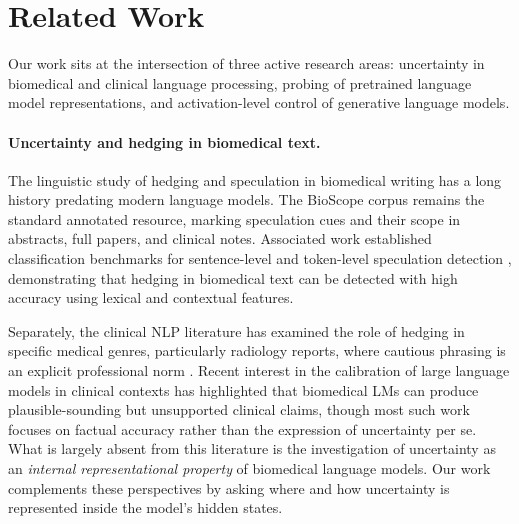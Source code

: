 \documentclass[11pt,a4paper]{article}
\begin{document}
\section{Related Work}

Our work sits at the intersection of three active research areas:
uncertainty in biomedical and clinical language processing, probing of
pretrained language model representations, and activation-level control
of generative language models.

\paragraph{Uncertainty and hedging in biomedical text.}
The linguistic study of hedging and speculation in biomedical writing has
a long history predating modern language models. The BioScope corpus
\citep{vincze2008bioscope} remains the standard annotated resource,
marking speculation cues and their scope in abstracts, full papers, and
clinical notes. Associated work established classification benchmarks for
sentence-level and token-level speculation detection
\citep{agarwal2010detecting, adel2015comparing}, demonstrating that
hedging in biomedical text can be detected with high accuracy using
lexical and contextual features.

Separately, the clinical NLP literature has examined the role of hedging
in specific medical genres, particularly radiology reports, where
cautious phrasing is an explicit professional norm
\citep{panicek2016radiology}. Recent interest in the calibration of
large language models in clinical contexts \citep{umapathi2023medhalt,
singhal2023medpalm} has highlighted that biomedical LMs can produce
plausible-sounding but unsupported clinical claims, though most such work
focuses on factual accuracy rather than the expression of uncertainty per
se. What is largely absent from this literature is the investigation of
uncertainty as an \emph{internal representational property} of
biomedical language models. Our work complements these perspectives by
asking where and how uncertainty is represented inside the model's hidden
states.
\end{document}
